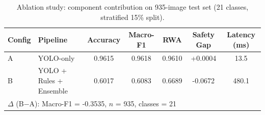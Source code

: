 \begin{table}[t]
\centering
\caption{Ablation study: component contribution on 935-image test set (21 classes, stratified 15\% split).}
\label{tab:ablation}
\begin{tabular}{llccccc}
\toprule
Config & Pipeline & Accuracy & Macro-F1 & RWA & Safety Gap & Latency (ms) \\
\midrule
A & YOLO-only & 0.9615 & 0.9618 & 0.9610 & +0.0004 & 13.5 \\
B & YOLO + Rules + Ensemble & 0.6017 & 0.6083 & 0.6689 & -0.0672 & 480.1 \\
\midrule
\multicolumn{7}{l}{$\Delta$ (B$-$A): Macro-F1 = -0.3535, $n$ = 935, classes = 21} \\
\bottomrule
\end{tabular}
\end{table}
